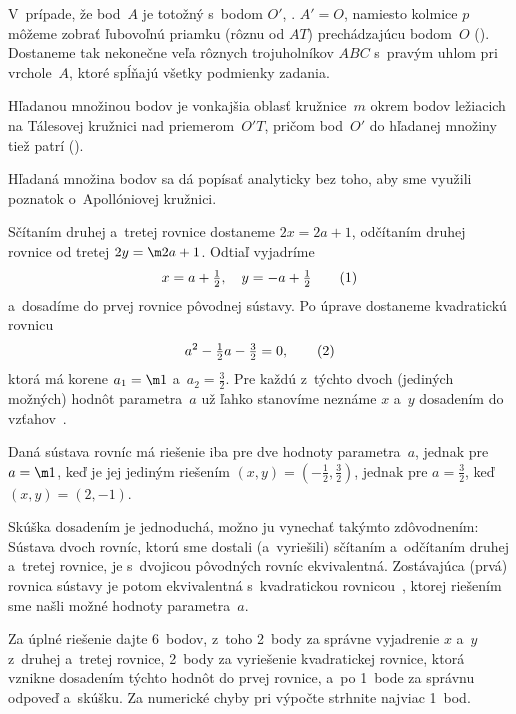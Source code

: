 {V~prípade, že bod~$A$ je totožný s~bodom $O'$, \tj. $A'=O$, namiesto kolmice $p$ môžeme zobrať ľubovoľnú priamku (rôznu od $AT$) prechádzajúcu bodom~$O$ (\obr). Dostaneme tak nekonečne veľa rôznych trojuholníkov $ABC$ s~pravým uhlom pri vrchole~$A$, ktoré spĺňajú všetky podmienky zadania.
%

\zaver
Hľadanou množinou bodov je vonkajšia oblasť kružnice~$m$ okrem bodov ležiacich na Tálesovej kružnici nad priemerom~$O'T$, pričom bod~$O'$ do hľadanej množiny tiež patrí (\obr).
%

\poznamka
Hľadaná množina bodov sa dá popísať analyticky bez toho, aby sme využili poznatok o~Apollóniovej kružnici.
}

{%
Sčítaním druhej a~tretej rovnice dostaneme $2x=2a+1$, odčítaním druhej rovnice od tretej $2y=\m2a+1$. Odtiaľ vyjadríme
$$
x=a+\tfrac12,\quad y=-a+\tfrac12
\tag1
$$
a~dosadíme do prvej rovnice pôvodnej sústavy. Po úprave dostaneme kvadratickú rovnicu
$$
a^2-\tfrac12a-\tfrac32=0,
\tag2
$$
ktorá má korene $a_1=\m1$ a~$a_2=\tfrac32$. Pre každú z~týchto dvoch (jediných možných) hodnôt parametra~$a$ už ľahko stanovíme neznáme $x$ a~$y$ dosadením do vzťahov~.

Daná sústava rovníc má riešenie iba pre dve hodnoty parametra~$a$, jednak pre $a=\m1$, keď je jej jediným riešením
$(x,y)=\left({-\tfrac12},{\tfrac32}\right)$, jednak pre $a=\tfrac32$, keď $(x,y)=\left(2,{-1}\right)$.

Skúška dosadením je jednoduchá, možno ju vynechať takýmto zdôvodnením: Sústava dvoch rovníc, ktorú sme dostali (a~vyriešili) sčítaním a~odčítaním druhej a~tretej rovnice, je s~dvojicou pôvodných rovníc ekvivalentná. Zostávajúca (prvá) rovnica sústavy je potom ekvivalentná s~kvadratickou rovnicou~, ktorej riešením sme našli možné hodnoty
parametra~$a$.

\nobreak\medskip\petit\noindent
Za úplné riešenie dajte 6~bodov, z~toho 2~body za správne vyjadrenie $x$ a~$y$ z~druhej a~tretej rovnice, 2~body za vyriešenie kvadratickej rovnice, ktorá vznikne dosadením týchto hodnôt do prvej rovnice, a~po 1~bode za správnu odpoveď a~skúšku. Za numerické chyby pri výpočte strhnite najviac 1~bod.

\endpetit
\bigbreak}

